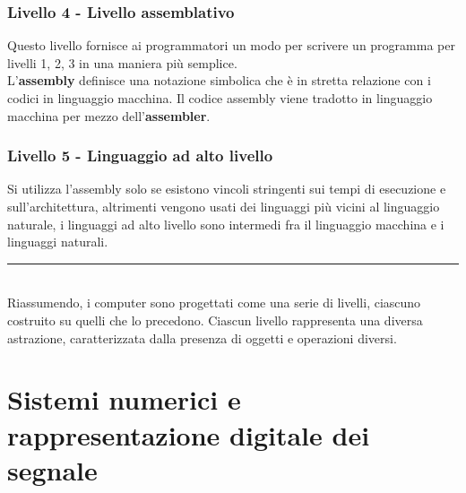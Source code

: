 \documentclass[12pt]{report}
\begin{document}
		\subsection{Livello 4 - Livello assemblativo}
		Questo livello fornisce ai programmatori un modo per scrivere un programma per livelli 1, 2, 3 in una maniera più semplice.
		\\
		L'\textbf{assembly} definisce una notazione simbolica che è in stretta relazione con i codici in linguaggio macchina. Il codice assembly viene tradotto in linguaggio macchina per mezzo dell'\textbf{assembler}.
		\subsection{Livello 5 - Linguaggio ad alto livello}
		Si utilizza l'assembly solo se esistono vincoli stringenti sui tempi di esecuzione e sull'architettura, altrimenti vengono usati dei linguaggi più vicini al linguaggio naturale, i linguaggi ad alto livello sono intermedi fra il linguaggio macchina e i linguaggi naturali.
		\par\noindent\rule{\textwidth}{0.4pt}
		\\
		Riassumendo, i computer sono progettati come una serie di livelli, ciascuno costruito su quelli che lo precedono. Ciascun livello rappresenta una diversa astrazione, caratterizzata dalla presenza di oggetti e operazioni diversi.
		\chapter{Sistemi numerici e rappresentazione digitale dei segnale}
\end{document}
